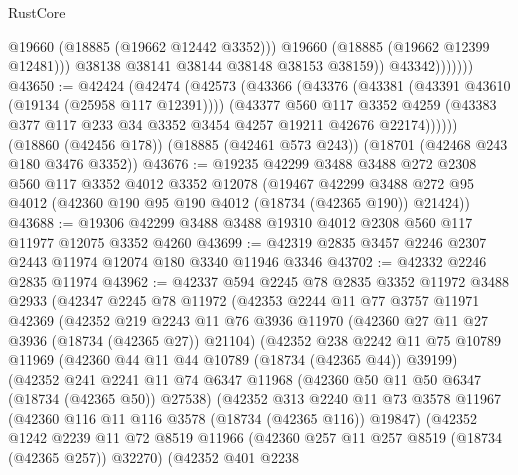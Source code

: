 \begin{lexlean}{RustCore}
\begin{coremodule}
                          @19660
                          (@18885 (@19662 @12442 @3352)))
                        @19660
                        (@18885 (@19662 @12399 @12481)))
                      @38138
                      @38141
                      @38144
                      @38148
                      @38153
                      @38159))
                  @43342)))))))
@43650 := @42424
    (@42474
      (@42573
        (@43366
          (@43376
            (@43381 (@43391 @43610 (@19134 (@25958 @117 @12391))))
            (@43377
              @560
              @117
              @3352
              @4259
              (@43383 @377 @117 @233 @34 @3352 @3454 @4257 @19211 @42676 @22174))))))
    (@18860 (@42456 @178))
    (@18885 (@42461 @573 @243))
    (@18701 (@42468 @243 @180 @3476 @3352))
@43676 := @19235
    @42299
    @3488
    @3488
    @272
    @2308
    @560
    @117
    @3352
    @4012
    @3352
    @12078
    (@19467 @42299 @3488 @272 @95 @4012 (@42360 @190 @95 @190 @4012 (@18734 (@42365 @190)) @21424))
@43688 := @19306 @42299 @3488 @3488 @19310 @4012 @2308 @560 @117 @11977 @12075 @3352 @4260
@43699 := @42319 @2835 @3457 @2246 @2307 @2443 @11974 @12074 @180 @3340 @11946 @3346
@43702 := @42332 @2246 @2835 @11974
@43962 := @42337
    @594
    @2245
    @78
    @2835
    @3352
    @11972
    @3488
    @2933
    (@42347
      @2245
      @78
      @11972
      (@42353
        @2244
        @11
        @77
        @3757
        @11971
        @42369
        (@42352
          @219
          @2243
          @11
          @76
          @3936
          @11970
          (@42360 @27 @11 @27 @3936 (@18734 (@42365 @27)) @21104)
          (@42352
            @238
            @2242
            @11
            @75
            @10789
            @11969
            (@42360 @44 @11 @44 @10789 (@18734 (@42365 @44)) @39199)
            (@42352
              @241
              @2241
              @11
              @74
              @6347
              @11968
              (@42360 @50 @11 @50 @6347 (@18734 (@42365 @50)) @27538)
              (@42352
                @313
                @2240
                @11
                @73
                @3578
                @11967
                (@42360 @116 @11 @116 @3578 (@18734 (@42365 @116)) @19847)
                (@42352
                  @1242
                  @2239
                  @11
                  @72
                  @8519
                  @11966
                  (@42360 @257 @11 @257 @8519 (@18734 (@42365 @257)) @32270)
                  (@42352
                    @401
                    @2238

\end{coremodule}
\end{lexlean}

